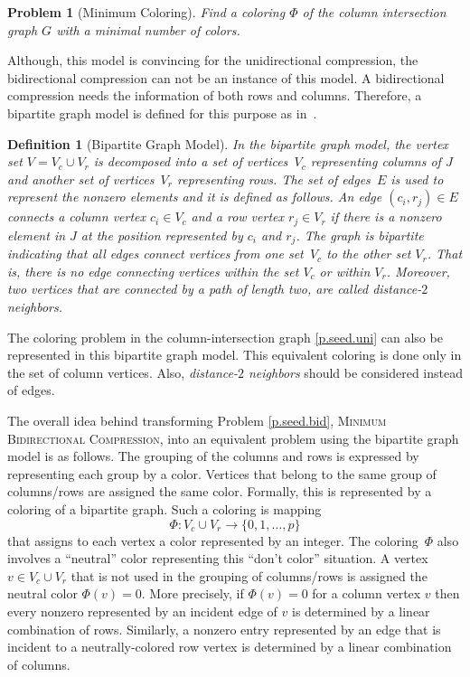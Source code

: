 \documentclass[12pt, twoside,a4paper,toc=bibliography]{scrbook}
\newtheorem{problem}{Problem}
\newtheorem{definition}{Definition}
\newcommand{\MinBidCom}{\textsc{Minimum Bidirectional Compression}}
\begin{document}
\begin{problem}[Minimum Coloring]
\label{p:mincol}
Find a coloring $\Phi$ of the column intersection graph $G$ with a minimal number of
colors.
\end{problem}

Although, this model is convincing for the unidirectional compression,
the bidirectional compression can not be an instance of this model.
A bidirectional compression needs the information of both rows and columns. Therefore, a bipartite graph model is defined for this purpose as in~\cite{Coleman1996SaE,cv:ecs,hs:csj}.

\begin{definition}[Bipartite Graph Model]
\label{d.bip.graph}
In the bipartite graph model, the vertex set $V=V_c\cup V_r$
is decomposed into a set of vertices~$V_c$ representing columns of $J$ and another set of
vertices~$V_r$ representing rows. The set of edges~$E$ is used to represent the nonzero
elements and it is defined as follows. An edge $(c_i , r_j) \in E$ connects a column
vertex $c_i \in V_c$ and a row vertex $r_j \in V_r$ if there is a nonzero element in $J$
at the position represented by $c_i$ and $r_j$. The graph is bipartite indicating that
all edges connect vertices from one set~$V_c$ to the other set $V_r$. That is, there is
no edge connecting vertices within the set $V_c$ or within $V_r$. Moreover, two vertices
that are connected by a path of length two, are called \emph{distance-$2$ neighbors}.
\end{definition}

The coloring problem in the column-intersection graph \ref{p.seed.uni} can also be represented in
this bipartite graph model. This equivalent coloring is done only in the set of
column vertices. Also, \emph{distance-$2$ neighbors} should be considered instead of
edges.

The overall idea behind transforming Problem \ref{p.seed.bid}, \MinBidCom, into an equivalent
problem using the bipartite graph model is as follows. The grouping of the columns and
rows is expressed by representing each group by a color. Vertices that belong to the same
group of columns/rows are assigned the same color. Formally, this is represented by a
coloring of a bipartite graph. Such a coloring is mapping
$$
\Phi:V_c \cup V_r \to \{0,1,\dots ,p\}
$$
that assigns to each vertex a color represented by an integer. 
The coloring~$\Phi$ also involves a ``neutral'' color
representing this ``don't color'' situation. A vertex $v \in V_c \cup V_r$ that is not
used in the grouping of columns/rows is assigned the neutral color $\Phi(v)=0$. More
precisely, if $\Phi(v)=0$ for a column vertex $v$ then every nonzero represented by an
incident edge of $v$ is determined by a linear combination of rows. Similarly, a nonzero
entry represented by an edge that is incident to a neutrally-colored row vertex is
determined by a linear combination of columns.
\end{document}
